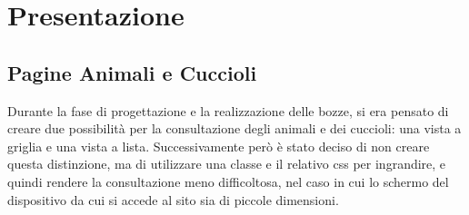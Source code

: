 \section{Presentazione}

\subsection{Pagine Animali e Cuccioli}
Durante la fase di progettazione e la realizzazione delle bozze, si era pensato di creare due possibilità per la consultazione degli animali e dei cuccioli: una vista a griglia e una vista a lista. Successivamente però è stato deciso di non creare questa distinzione, ma di utilizzare una classe e il relativo css per ingrandire, e quindi rendere la consultazione meno difficoltosa, nel caso in cui lo schermo del dispositivo da cui si accede al sito sia di piccole dimensioni.
\pagebreak